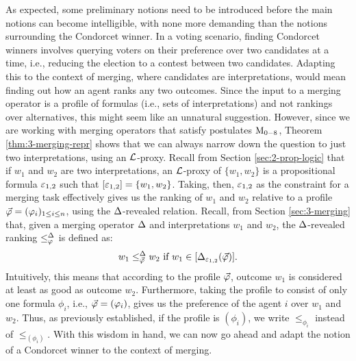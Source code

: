 As expected, some preliminary notions need to be introduced
before the main notions can become intelligible,
with none more demanding than the notions surrounding the Condorcet winner.
In a voting scenario, finding Condorcet winners involves querying voters 
on their preference over two candidates at a time, 
i.e., reducing the election to a contest between two candidates.
Adapting this to the context of merging, where candidates are interpretations,
would mean finding out how an agent ranks any two outcomes.
Since the input to a merging operator is a profile of formulas (i.e., sets of interpretations)
and not rankings over alternatives, this might seem like an unnatural suggestion.
However, 
since we are working with merging operators that satisfy postulates $\ppm{0-8}$,
Theorem \ref{thm:3-merging-repr} shows that we can always narrow down the question 
to just two interpretations, using an $\L$-proxy.
Recall from Section \ref{sec:2-prop-logic} that if $w_1$ and $w_2$ are two interpretations,
an $\L$-proxy of $\{w_1,w_2\}$ is a propositional formula $\px_{1,2}$
such that $[\px_{1,2}]=\{w_1,w_2\}$.
Taking, then, $\px_{1,2}$ as the constraint for a merging task effectively 
gives us the ranking of $w_1$ and $w_2$ relative to a profile $\P=(\phi_i)_{1\le i \le n}$,
using the $\me$-revealed relation.
Recall, from Section \ref{sec:3-merging} that, 
given a merging operator $\me$
and interpretations $w_1$ and $w_2$,
the $\me$-revealed ranking $\le^\me_\phi$ is defined as:
	$$
		w_1\le^\me_\P w_2~\text{if}~w_1\in[\me_{\px_{1,2}}(\P)].
	$$
Intuitively, this means that according to the profile $\P$,
outcome $w_1$ is considered at least as good as outcome $w_2$.
Furthermore, taking the profile to consist of only one formula $\phi_i$,
i.e., $\P=(\phi_i)$,
gives us the preference of the agent $i$ over $w_1$ and $w_2$.
Thus, as previously established, 
if the profile is $(\phi_i)$, we write $\le_{\phi_i}$ instead of $\le_{(\phi_i)}$.
With this wisdom in hand,
we can now go ahead and adapt the notion of a Condorcet winner to the context of merging.

